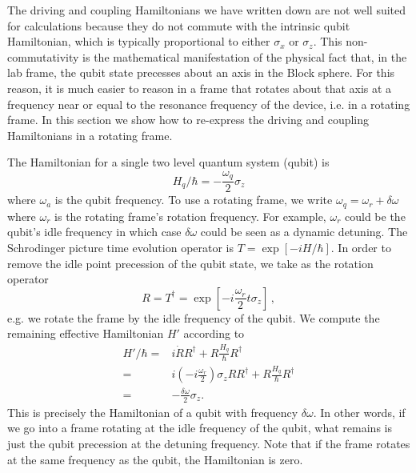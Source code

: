 
The driving and coupling Hamiltonians we have written down are not well suited for calculations because they do not commute with the intrinsic qubit Hamiltonian, which is typically proportional to either $\sigma_x$ or $\sigma_z$.
This non-commutativity is the mathematical manifestation of the physical fact that, in the lab frame, the qubit state precesses about an axis in the Block sphere.
For this reason, it is much easier to reason in a frame that rotates about that axis at a frequency near or equal to the resonance frequency of the device, i.e. in a rotating frame.
In this section we show how to re-express the driving and coupling Hamiltonians in a rotating frame.

The Hamiltonian for a single two level quantum system (qubit) is \begin{equation}
H_q/\hbar = -\frac{\omega_q}{2}\sigma_z \end{equation}
where $\omega_a$ is the qubit frequency.
To use a rotating frame, we write $\omega_q = \omega_r + \delta\omega$ where $\omega_r$ is the rotating frame's rotation frequency.
For example, $\omega_r$ could be the qubit's idle frequency in which case $\delta \omega$ could be seen as a dynamic detuning.
The Schrodinger picture time evolution operator is $T=\exp \left[-i H/\hbar \right]$.
In order to remove the idle point precession of the qubit state, we take as the rotation operator \begin{equation}
  R = T^{\dagger} = \exp \left[ -i \frac{\omega_r}{2} t \sigma_z \right] \, ,
\end{equation}
e.g. we rotate the frame by the idle frequency of the qubit.
We compute the remaining effective Hamiltonian $H'$ according to 
\begin{align}
  H'/\hbar
  =& i\dot{R}R^{\dagger} + R \frac{H_q}{\hbar} R^\dagger \nonumber \\
  =& i \left(-i \frac{\omega_r}{2} \right)\sigma_z RR^{\dagger}
    + R\frac{H_q}{\hbar}R^{\dagger} \nonumber \\
  =& -\frac{\delta\omega}{2}\sigma_z.
\end{align}
This is precisely the Hamiltonian of a qubit with frequency $\delta\omega$.
In other words, if we go into a frame rotating at the idle frequency of the qubit, what remains is just the qubit precession at the detuning frequency.
Note that if the frame rotates at the same frequency as the qubit, the Hamiltonian is zero.

